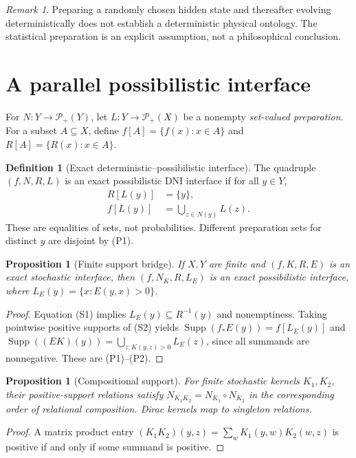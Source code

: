\documentclass[11pt,letterpaper]{article}
\newtheorem{proposition}[theorem]{Proposition}
\theoremstyle{definition}\newtheorem{definition}[theorem]{Definition}
\theoremstyle{remark}\newtheorem{remark}[theorem]{Remark}
\newcommand{\PP}{\mathcal{P}}
\newcommand{\Supp}{\operatorname{Supp}}
\begin{document}
\begin{remark}
Preparing a randomly chosen hidden state and thereafter evolving deterministically does not establish a deterministic physical ontology. The statistical preparation is an explicit assumption, not a philosophical conclusion.
\end{remark}

\section{A parallel possibilistic interface}
For $N:Y\to\PP_+(Y)$, let $L:Y\to\PP_+(X)$ be a nonempty \emph{set-valued preparation}. For a subset $A\subseteq X$, define $f[A]=\{f(x):x\in A\}$ and $R[A]=\{R(x):x\in A\}$.
\begin{definition}[Exact deterministic--possibilistic interface]\label{def:poss}
The quadruple $(f,N,R,L)$ is an exact possibilistic DNI interface if for all $y\in Y$,
\begin{align}
R[L(y)]&=\{y\},\tag{P1}\label{eq:p1}\\
 f[L(y)]&=\bigcup_{z\in N(y)}L(z).\tag{P2}\label{eq:p2}
\end{align}
These are equalities of sets, not probabilities. Different preparation sets for distinct $y$ are disjoint by (P1).
\end{definition}
\begin{proposition}[Finite support bridge]\label{prop:support}
If $X,Y$ are finite and $(f,K,R,E)$ is an exact stochastic interface, then $(f,N_K,R,L_E)$ is an exact possibilistic interface, where $L_E(y)=\{x:E(y,x)>0\}$.
\end{proposition}
\begin{proof}
Equation (S1) implies $L_E(y)\subseteq R^{-1}(y)$ and nonemptiness. Taking pointwise positive supports of (S2) yields
$\Supp(f_*E(y))=f[L_E(y)]$ and $\Supp((EK)(y))=\bigcup_{z:K(y,z)>0}L_E(z)$, since all summands are nonnegative. These are (P1)--(P2).
\end{proof}
\begin{proposition}[Compositional support]\label{prop:comp}
For finite stochastic kernels $K_1,K_2$, their positive-support relations satisfy $N_{K_1K_2}=N_{K_1}\circ N_{K_2}$ in the corresponding order of relational composition. Dirac kernels map to singleton relations.
\end{proposition}
\begin{proof}
A matrix product entry $(K_1K_2)(y,z)=\sum_w K_1(y,w)K_2(w,z)$ is positive if and only if some summand is positive.
\end{proof}
\end{document}
